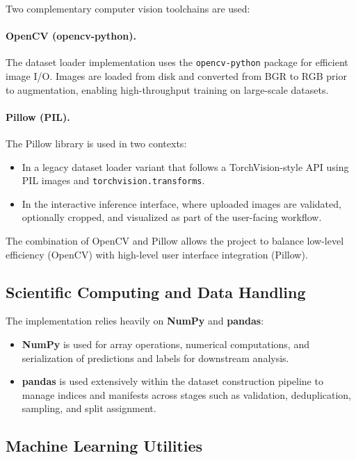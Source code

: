 Two complementary computer vision toolchains are used:

\paragraph{OpenCV (opencv-python).}
The dataset loader implementation uses the \texttt{opencv-python} package for efficient image I/O. Images are loaded from disk and converted from BGR to RGB prior to augmentation, enabling high-throughput training on large-scale datasets.

\paragraph{Pillow (PIL).}
The Pillow library is used in two contexts:
\begin{itemize}
  \item In a legacy dataset loader variant that follows a TorchVision-style API using PIL images and \texttt{torchvision.transforms}.
  \item In the interactive inference interface, where uploaded images are validated, optionally cropped, and visualized as part of the user-facing workflow.
\end{itemize}

The combination of OpenCV and Pillow allows the project to balance low-level efficiency (OpenCV) with high-level user interface integration (Pillow).

\subsection{Scientific Computing and Data Handling}

The implementation relies heavily on \textbf{NumPy} and \textbf{pandas}:
\begin{itemize}
  \item \textbf{NumPy} is used for array operations, numerical computations, and serialization of predictions and labels for downstream analysis.
  \item \textbf{pandas} is used extensively within the dataset construction pipeline to manage indices and manifests across stages such as validation, deduplication, sampling, and split assignment.
\end{itemize}

\subsection{Machine Learning Utilities}

